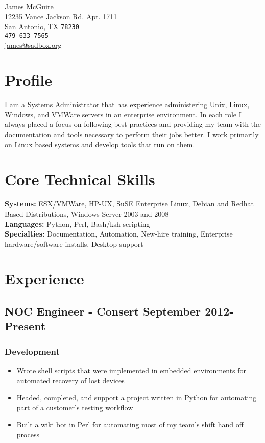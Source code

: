 \documentclass[10pt]{article}
\begin{document}
{\LARGE James McGuire}\\[0.5cm]
12235 Vance Jackson Rd. Apt. 1711\\
San Antonio, TX \texttt{78230}\\[.2cm]
\texttt{479-633-7565}\\
\href{mailto:james@sadbox.org}{james@sadbox.org}\\

\section*{Profile}
I am a Systems Administrator that has experience administering Unix, Linux, Windows, and VMWare servers in an enterprise environment. In each role I always placed a focus on following best practices and providing my team with the documentation and tools necessary to perform their jobs better. I work primarily on Linux based systems and develop tools that run on them.

\section*{Core Technical Skills}
\textbf{Systems:} ESX/VMWare, HP-UX, SuSE Enterprise Linux, Debian and Redhat Based Distributions, Windows Server 2003 and 2008 \\
\textbf{Languages:} Python, Perl, Bash/ksh scripting \\
\textbf{Specialties:} Documentation, Automation, New-hire training, Enterprise hardware/software installs, Desktop support \\

\section*{Experience}
\subsection*{NOC Engineer - Consert \hfill September 2012-Present}
\subsubsection*{Development}
\begin{itemize}
    \item Wrote shell scripts that were implemented in embedded environments for automated recovery of lost devices
    \item Headed, completed, and support a project written in Python for automating part of a customer's testing workflow
    \item Built a wiki bot in Perl for automating most of my team's shift hand off process
\end{itemize}
\end{document}
